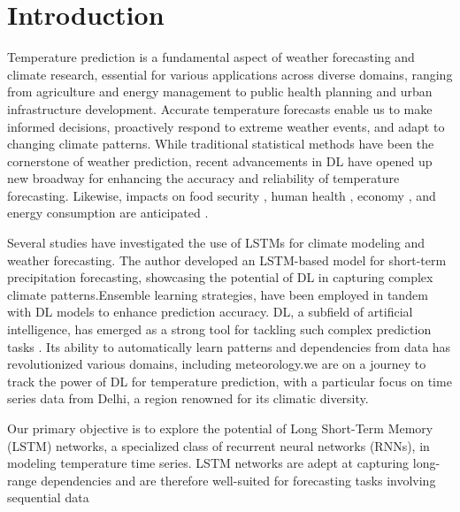 \documentclass[sn-mathphys,Numbered]{sn-jnl}
\theoremstyle{thmstyleone}
\theoremstyle{thmstyletwo}
\theoremstyle{thmstylethree}
\begin{document}



\maketitle

\section{Introduction}\label{sec1}

Temperature prediction is a fundamental aspect of weather forecasting and climate research, essential for various applications across diverse domains, ranging from agriculture and energy management to public health planning and urban infrastructure development. Accurate temperature forecasts enable us to make informed decisions, proactively respond to extreme weather events, and adapt to changing climate patterns. While traditional statistical methods have been the cornerstone of weather prediction, recent advancements in DL have opened up new broadway for enhancing the accuracy and reliability of temperature forecasting. Likewise, impacts on food security \cite{darapaneni2021food}, human health \cite{miotto2018deep}, economy \cite{dehghani2021enhancing}, and energy consumption are anticipated \cite{cifuentes2020air}.

Several studies have investigated the use of LSTMs for climate modeling and weather forecasting. \cite{qin2017dual} The author developed an LSTM-based model for short-term precipitation forecasting, showcasing the potential of DL in capturing complex climate patterns.Ensemble learning strategies, have been employed in tandem with DL models to enhance prediction accuracy\cite{shi2015convolutional}. DL, a subfield of artificial intelligence, has emerged as a strong tool for tackling such complex prediction tasks \cite{karpatne2017theory} . Its ability to automatically learn patterns and dependencies from data has revolutionized various domains, including meteorology.we are on a journey to track the power of DL for temperature prediction, with a particular focus on time series data from Delhi, a region renowned for its climatic diversity.

Our primary objective is to explore the potential of Long Short-Term Memory (LSTM) networks, a specialized class of recurrent neural networks (RNNs), in modeling temperature time series. LSTM networks are adept at capturing long-range dependencies and are therefore well-suited for forecasting tasks involving sequential data
\end{document}

